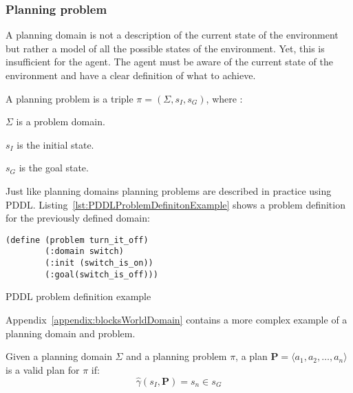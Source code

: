 \subsubsection{Planning problem}
A planning domain is not a description of the current state of the environment 
but rather a model of all the possible states of the environment. 
Yet, this is insufficient for the agent. The agent must be aware 
of the current state of the environment and have a clear definition 
of what to achieve.

\begin{Tdef}
    A planning problem is a triple $\pi = (\Sigma,s_I,s_G)$, where :
    \vspace{-0.5em}
    \begin{compactitem}
        \item 
        $\Sigma$ is a problem domain.
        
        \item 
        $s_I$ is the initial state.
        
        \item 
        $s_G$ is the goal state.
    \end{compactitem}
    \vspace{-0.5em}
\end{Tdef}
\vspace{-0.5em}
Just like planning domains planning problems are described in practice using PDDL. 
Listing~\ref{lst:PDDLProblemDefinitonExample} shows a problem definition for the previously defined domain:
\begin{Listing}
    \begin{lstlisting}[language=PDDL]
    (define (problem turn_it_off)
        (:domain switch)
        (:init (switch_is_on))
        (:goal(switch_is_off)))
  \end{lstlisting}
    \caption{PDDL problem definition example}
    \label{lst:PDDLProblemDefinitonExample}
\end{Listing}

Appendix~\ref{appendix:blocksWorldDomain} contains a more complex example of a planning domain and problem.

\begin{Tdef}
    Given a planning domain $\Sigma$ and a planning problem $\pi$,
    a plan $\mathbf{P} = \langle a_1,a_2,\dots,a_n\rangle$ is a valid plan for $\pi$ if:
    $$\hat{\gamma}(s_I,\mathbf{P}) = s_n \in s_G$$
\end{Tdef}

